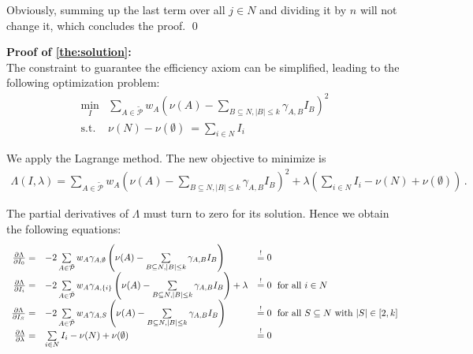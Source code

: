 Obviously, summing up the last term over all $j \in N$ and dividing it by $n$ will not change it, which concludes the proof. \qed

\textbf{Proof of \cref{the:solution}:} \\
The constraint to guarantee the efficiency axiom can be simplified, leading to the following optimization problem:
\begin{equation*}
	\begin{array}{rl}
		\displaystyle\min_I & \sum\limits_{A \in \tilde{\mathcal{P}}} w_A \left( \nu(A) - \sum\limits_{B \subseteq N, |B| \leq k} \gamma_{A,B} I_B \right)^2 \\
		\text{s.t.} & \nu(N) - \nu(\emptyset) \ = \sum\limits_{i \in N} I_i
	\end{array}
\end{equation*}

We apply the Lagrange method.
The new objective to minimize is
\begin{equation*}
	\begin{array}{rl}
		\Lambda(I, \lambda) = \sum\limits_{A \in \tilde{\mathcal{P}}} w_A \left( \nu(A) - \sum\limits_{B \subseteq N, |B| \leq k} \gamma_{A,B} I_B \right)^2 + \lambda \left( \sum\limits_{i \in N} I_i - \nu(N) + \nu(\emptyset) \right) \, .
	\end{array}
\end{equation*}

The partial derivatives of $\Lambda$ must turn to zero for its solution.
Hence we obtain the following equations:
\begin{equation*}
	\begin{array}{rll}
        \frac{\partial \Lambda}{\partial I_0} = & - 2 \sum\limits_{A \in \tilde{\mathcal{P}}} w_A \gamma_{A,\emptyset} \left( \nu(A) - \sum\limits_{B \subseteq N, |B| \leq k} \gamma_{A,B} I_B \right) & \stackrel{!}{=} 0 \\
        \frac{\partial \Lambda}{\partial I_i} = & - 2 \sum\limits_{A \in \tilde{\mathcal{P}}} w_A \gamma_{A,\{i\}} \left( \nu(A) - \sum\limits_{B \subseteq N, |B| \leq k} \gamma_{A,B} I_B \right) + \lambda & \stackrel{!}{=} 0 \hspace{0.1cm} \text{ for all } i \in N \\
        \frac{\partial \Lambda}{\partial I_S} = & - 2 \sum\limits_{A \in \tilde{\mathcal{P}}} w_A \gamma_{A,S} \left( \nu(A) - \sum\limits_{B \subseteq N, |B| \leq k} \gamma_{A,B} I_B \right) & \stackrel{!}{=} 0 \hspace{0.1cm} \text{ for all } S \subseteq N \text{ with } |S| \in [2,k] \\
        \frac{\partial \Lambda}{\partial \lambda} = & \sum\limits_{i \in N} I_i - \nu(N) + \nu(\emptyset) & \stackrel{!}{=} 0
	\end{array}
\end{equation*}

